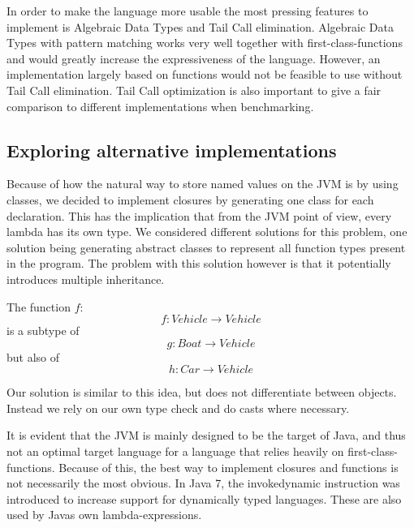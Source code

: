 

In order to make the language more usable the most pressing features to implement is Algebraic Data Types and Tail Call elimination. Algebraic Data Types with pattern matching works very well together with first-class-functions and would greatly increase the expressiveness of the language. However, an implementation largely based on functions would not be feasible to use without Tail Call elimination. Tail Call optimization is also important to give a fair comparison to different implementations when benchmarking. 


\subsection{Exploring alternative implementations}

Because of how the natural way to store named values on the JVM is by using classes, we decided to implement closures by generating one class for each declaration. This has the implication that from the JVM point of view, every lambda has its own type. We considered different solutions for this problem, one solution being generating abstract classes to represent all function types present in the program. The problem with this solution however is that it potentially introduces multiple inheritance.

\noindent
The function $f$:
$$
f : Vehicle \rightarrow Vehicle
$$
is a subtype of 
$$
g : Boat \rightarrow Vehicle
$$
but also of 
$$
h : Car \rightarrow Vehicle
$$

Our solution is similar to this idea, but does not differentiate between objects. Instead we rely on our own type check and do casts where necessary.

It is evident that the JVM is mainly designed to be the target of Java, and thus not an optimal target language for a language that relies heavily on first-class-functions. Because of this, the best way to implement closures and functions is not necessarily the most obvious. In Java 7, the invokedynamic instruction was introduced to increase support for dynamically typed languages. These are also used by Javas own lambda-expressions.

